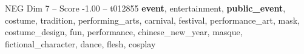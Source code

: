 \begin{textsample}{NEG Dim 7 – Score -1.00 – t012855}  \label{ex:f7_neg_023}
\textbf{event}, entertainment, \textbf{public\_event}, costume, tradition, performing\_arts, carnival, festival, performance\_art, mask, costume\_design, fun, performance, chinese\_new\_year, masque, fictional\_character, dance, flesh, cosplay

\end{textsample}
